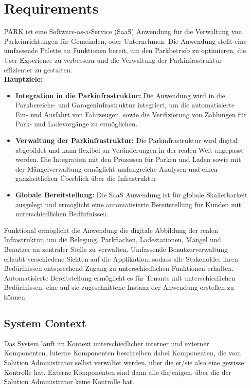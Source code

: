 \section{Requirements}

PARK ist eine Software-as-a-Service (SaaS) Anwendung für die Verwaltung von Parkeinrichtungen für Gemeinden, oder Unternehmen.
Die Anwendung stellt eine umfassende Palette an Funktionen bereit, um den Parkbetrieb zu optimieren, 
die User Experience zu verbessern und die Verwaltung der Parkinfrastruktur effizienter zu gestalten.  \\


\textbf{Hauptziele:}

\begin{itemize}
    \item \textbf{Integration in die Parkinfrastruktur:} Die Anwendung wird in die Parkbereichs- und Garageninfrastruktur integriert, um die automatisierte Ein- und Ausfahrt von Fahrzeugen, sowie die Verifizierung von Zahlungen für Park- und Ladevorgänge zu ermöglichen.
    \item \textbf{Verwaltung der Parkinfrastruktur:} Die Parkinfrastruktur wird digital abgebildet und kann flexibel an Veränderungen in der realen Welt angepasst werden. Die Integration mit den Prozessen für Parken und Laden sowie mit der Mängelverwaltung ermöglicht umfangreiche Analysen und einen ganzheitlichen Überblick über die Infrastruktur
    \item \textbf{Globale Bereitstellung:} Die SaaS Anwendung ist für globale Skalierbarkeit ausgelegt und ermöglicht eine automatisierte Bereitstellung für Kunden mit unterschiedlichen Bedürfnissen.
\end{itemize}


Funktional ermöglicht die Anwendung die digitale Abbildung der realen Infrastruktur, um die Belegung, Parkflächen, Ladestationen, Mängel und Benutzer an zentraler Stelle zu verwalten. Umfassende Benutzerverwaltung erlaubt verschiedene Sichten auf die Applikation, sodass alle Stakeholder ihren Bedürfnissen entsprechend Zugang zu unterschiedlichen Funktionen erhalten. Automatisierte Bereitstellung ermöglicht es für Tenants mit unterschiedlichen Bedürfnissen, eine auf sie zugeschnittene Instanz der Anwendung erstellen zu können.


\subsection{System Context}

Das System läuft im Kontext unterschiedlicher interner und externer Komponenten. Interne Komponenten beschreiben dabei Komponenten, die vom Solution Administrator selbst verwaltet werden, über die er/sie also eine gewisse Kontrolle hat. Externe Komponenten sind dann alle diejenigen, über die der Solution Administrator keine Kontrolle hat. 

